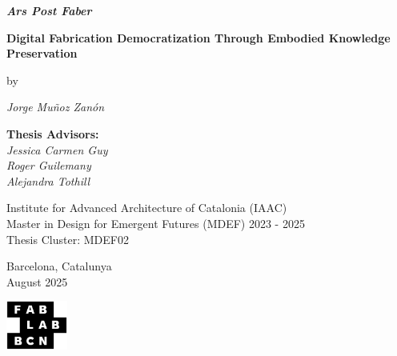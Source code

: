\begin{titlepage}
\centering
\vspace*{2.5cm}

{\fontsize{24}{28}\selectfont\textbf{\textit{Ars Post Faber}}}

\vspace{0.3cm}

{\fontsize{18}{22}\selectfont\textbf{Digital Fabrication Democratization Through Embodied Knowledge Preservation}}

\vspace{0.4cm}

{\fontsize{14}{16}\selectfont by}

\vspace{0.4cm}

{\fontsize{14}{20}\selectfont\textit{Jorge Muñoz Zanón}}

\vspace{1.5cm}

{\fontsize{14}{15}\selectfont
\textbf{Thesis Advisors:}\\[0.1cm]
\textit{Jessica Carmen Guy\\
Roger Guilemany\\
Alejandra Tothill}
}

\vspace{2cm}

{\fontsize{12}{15}\selectfont
Institute for Advanced Architecture of Catalonia (IAAC)\\[0.05cm]
Master in Design for Emergent Futures (MDEF) 2023 - 2025\\[0.05cm]
Thesis Cluster: MDEF02
}

\vspace{2cm}

{\fontsize{14}{16}\selectfont Barcelona, Catalunya\\[0.05cm]
August 2025}

\vspace{3cm}

\begin{center}
\hspace{1.5cm}
\includegraphics[height=1.6cm]{figures/logo/fablabbcn-logo.pdf}
\end{center}

\end{titlepage}